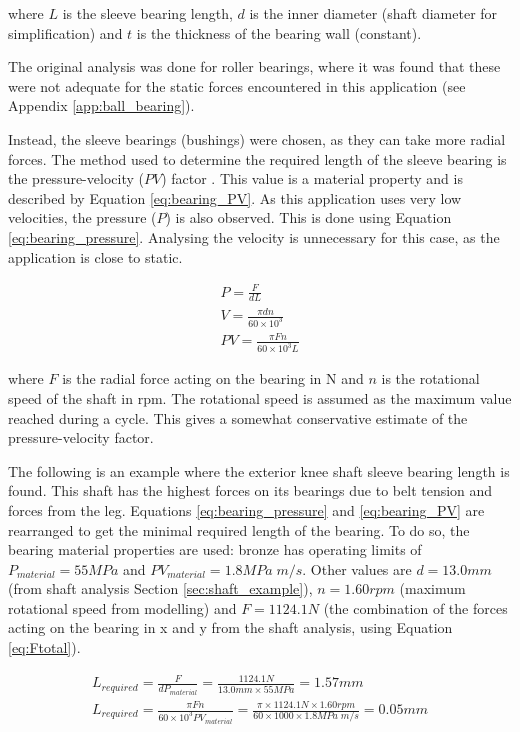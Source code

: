 where $L$ is the sleeve bearing length, $d$ is the inner diameter (shaft diameter for simplification) and $t$ is the thickness of the bearing wall (constant).

The original analysis was done for roller bearings, where it was found that these were not adequate for the static forces encountered in this application (see Appendix \ref{app:ball_bearing}).

Instead, the sleeve bearings (bushings) were chosen, as they can take more radial forces. The method used to determine the required length of the sleeve bearing is the pressure-velocity ($PV$) factor \cite{daemar_inc_bushing_2013}. This value is a material property and is described by Equation \ref{eq:bearing_PV}. As this application uses very low velocities, the pressure ($P$) is also observed. This is done using Equation \ref{eq:bearing_pressure}. Analysing the velocity is unnecessary for this case, as the application is close to static.

\begin{gather}
    P=\frac{F}{dL} \label{eq:bearing_pressure}
    \\
    V=\frac{\pi{}dn}{60\times10^3} \label{eq:bearing_velocity}
    \\
    PV=\frac{\pi{}Fn}{60\times10^3L} \label{eq:bearing_PV}
\end{gather}

where $F$ is the radial force acting on the bearing in N and $n$ is the rotational speed of the shaft in rpm. The rotational speed is assumed as the maximum value reached during a cycle. This gives a somewhat conservative estimate of the pressure-velocity factor.

The following is an example where the exterior knee shaft sleeve bearing length is found. This shaft has the highest forces on its bearings due to belt tension and forces from the leg. Equations \ref{eq:bearing_pressure} and \ref{eq:bearing_PV} are rearranged to get the minimal required length of the bearing. To do so, the bearing material properties are used: bronze has operating limits of $P_{material}=55 MPa$ and $PV_{material}=1.8 MPa \;m/s$. Other values are $d = 13.0 mm$ (from shaft analysis Section \ref{sec:shaft_example}), $n = 1.60 rpm$ (maximum rotational speed from modelling) and $F = 1124.1 N$ (the combination of the forces acting on the bearing in x and y from the shaft analysis, using Equation \ref{eq:Ftotal}).

\begin{gather}
    L_{required}=\frac{F}{dP_{material}}=\frac{1124.1 N}{13.0 mm \times 55 MPa}=1.57 mm
    \\
    L_{required}=\frac{\pi{}Fn}{60\times10^3PV_{material}}=\frac{\pi\times1124.1 N\times 1.60 rpm}{60\times 1000 \times 1.8 MPa\;m/s}=0.05 mm
\end{gather}

